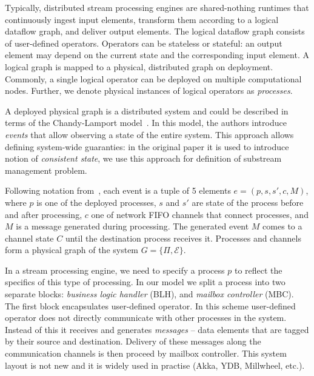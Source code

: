 Typically, distributed stream processing engines are shared-nothing runtimes that continuously ingest input elements, transform them according to a logical dataflow graph, and deliver output elements. The logical dataflow graph consists of user-defined operators. Operators can be stateless or stateful: an output element may depend on the current state and the corresponding input element. A logical graph is mapped to a physical, distributed graph on deployment. Commonly, a single logical operator can be deployed on multiple computational nodes. Further, we denote physical instances of logical operators as {\em processes}.

A deployed physical graph is a distributed system and could be described in terms of the Chandy-Lamport model~\cite{Chandy:1985:DSD:214451.214456, carbone2018scalable}. In this model, the authors introduce \textit{events} that allow observing a state of the entire system. This approach allows defining system-wide guaranties: in the original paper it is used to introduce notion of {\em consistent state}, we use this approach for definition of substream management problem.

Following notation from~\cite{Chandy:1985:DSD:214451.214456, carbone2018scalable}, each event is a tuple of 5 elements $e = (p, s, s', c, M)$, where $p$ is one of the deployed processes, $s$ and $s'$ are state of the process before and after processing, $c$ one of network FIFO channels that connect processes, and $M$ is a message generated during processing. The generated event $M$ comes to a channel state $C$ until the destination process receives it. Processes and channels form a physical graph of the system $G=\{\Pi,\mathcal{E}\}$.

In a stream processing engine, we need to specify a process $p$ to reflect the specifics of this type of processing. In our model we split a process into two separate blocks: {\em business logic handler} (BLH), and {\em mailbox controller} (MBC). The first block encapsulates user-defined operator. In this scheme user-defined operator does not directly communicate with other processes in the system. Instead of this it receives and generates {\em messages} -- data elements that are tagged by their source and destination. Delivery of these messages along the communication channels is then proceed by mailbox controller. This system layout is not new and it is widely used in practise (Akka, YDB, Millwheel, etc.).

